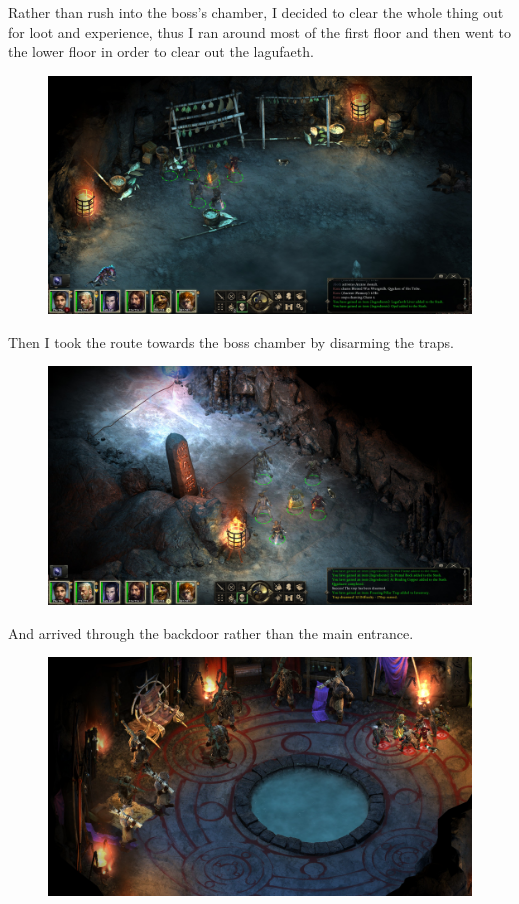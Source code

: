 \documentclass{article}
\begin{document}
Rather than rush into the boss's chamber, I decided to clear the whole thing out for loot and experience, thus I ran around most of the first floor and then went to the lower floor in order to clear out the lagufaeth.

\begin{figure}
\includegraphics[scale=0.33]{files/blog/2019_08_17_poe_potd_wmpt1/2019_08_17_russetwood_3.jpg}
\end{figure}

Then I took the route towards the boss chamber by disarming the traps.

\begin{figure}
\includegraphics[scale=0.33]{files/blog/2019_08_17_poe_potd_wmpt1/2019_08_17_russetwood_4.jpg}
\end{figure}

And arrived through the backdoor rather than the main entrance.

\begin{figure}
\includegraphics[scale=0.33]{files/blog/2019_08_17_poe_potd_wmpt1/2019_08_17_russetwood_5.jpg}
\end{figure}
\end{document}
